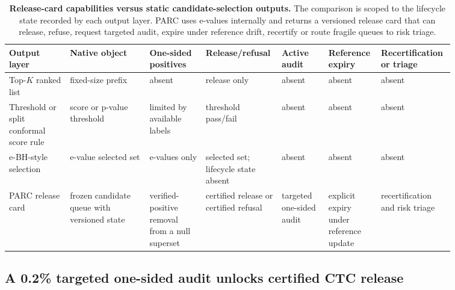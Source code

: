 \documentclass[10pt,twocolumn]{article}
\begin{document}
\begin{table}[t]
  \centering
  \scriptsize
  \setlength{\tabcolsep}{2pt}
  \renewcommand{\arraystretch}{1.08}
  \begin{tabular}{@{}P{0.13\linewidth}P{0.17\linewidth}P{0.12\linewidth}P{0.12\linewidth}P{0.10\linewidth}P{0.10\linewidth}P{0.12\linewidth}@{}}
    \toprule
    Output layer & Native object & One-sided positives & Release/refusal & Active audit & Reference expiry & Recertification or triage \\
    \midrule
    Top-\(K\) ranked list & fixed-size prefix & absent & release only & absent & absent & absent \\
    Threshold or split conformal score rule & score or p-value threshold & limited by available labels & threshold pass/fail & absent & absent & absent \\
    e-BH-style selection & e-value selected set & e-values only & selected set; lifecycle state absent & absent & absent & absent \\
    PARC release card & frozen candidate queue with versioned state & verified-positive removal from a null superset & certified release or certified refusal & targeted one-sided audit & explicit expiry under reference update & recertification and risk triage \\
    \bottomrule
  \end{tabular}
  \caption{\textbf{Release-card capabilities versus static candidate-selection outputs.} The comparison is scoped to the lifecycle state recorded by each output layer. PARC uses e-values internally and returns a versioned release card that can release, refuse, request targeted audit, expire under reference drift, recertify or route fragile queues to risk triage.}
  \label{tab:capability}
\end{table}

\subsection{A 0.2\% targeted one-sided audit unlocks certified CTC release}
\end{document}
